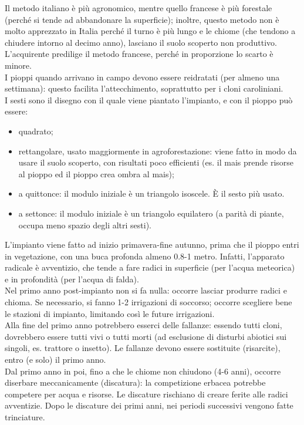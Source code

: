 Il metodo italiano è più agronomico, mentre quello francese è più forestale (perché si tende ad abbandonare la superficie); inoltre, questo metodo non è molto apprezzato in Italia perché il turno è più lungo e le chiome (che tendono a chiudere intorno al decimo anno), lasciano il suolo scoperto non produttivo. L'acquirente predilige il metodo francese, perché in proporzione lo scarto è minore.\\
I pioppi quando arrivano in campo devono essere reidratati (per almeno una settimana): questo facilita l'attecchimento, soprattutto per i cloni caroliniani.\\
I sesti sono il disegno con il quale viene piantato l'impianto, e con il pioppo può essere:
\begin{itemize}[nosep]
    \item quadrato;
    \item rettangolare, usato maggiormente in agroforestazione: viene fatto in modo da usare il suolo scoperto, con risultati poco efficienti (es. il mais prende risorse al pioppo ed il pioppo crea ombra al mais);
    \item a quittonce: il modulo iniziale è un triangolo isoscele. È il sesto più usato.
    \item a settonce: il modulo iniziale è un triangolo equilatero (a parità di piante, occupa meno spazio degli altri sesti).
\end{itemize}
L'impianto viene fatto ad inizio primavera-fine autunno, prima che il pioppo entri in vegetazione, con una buca profonda almeno 0.8-1 metro. Infatti, l'apparato radicale è avventizio, che tende a fare radici in superficie (per l'acqua meteorica) e in profondità (per l'acqua di falda).\\
Nel primo anno post-impianto non si fa nulla: occorre lasciar produrre radici e chioma. Se necessario, si fanno 1-2 irrigazioni di soccorso; occorre scegliere bene le stazioni di impianto, limitando così le future irrigazioni.\\
Alla fine del primo anno potrebbero esserci delle fallanze: essendo tutti cloni, dovrebbero essere tutti vivi o tutti morti (ad esclusione di disturbi abiotici sui singoli, es. trattore o insetto). Le fallanze devono essere sostituite (risarcite), entro (e solo) il primo anno.\\
Dal primo anno in poi, fino a che le chiome non chiudono (4-6 anni), occorre diserbare meccanicamente (discatura): la competizione erbacea potrebbe competere per acqua e risorse. Le discature rischiano di creare ferite alle radici avventizie. Dopo le discature dei primi anni, nei periodi successivi vengono fatte trinciature.\\
